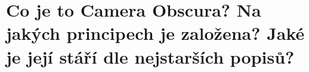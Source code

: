 \section{Co je to Camera Obscura? Na jakých principech je založena? Jaké je její stáří dle nejstarších popisů?}